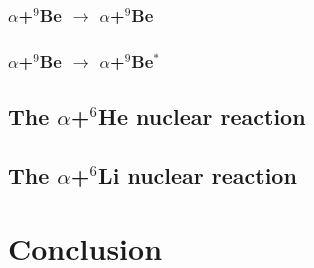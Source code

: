 \documentclass[
11pt, %
english, %
onehalfspacing, %
headsepline, %
]{MastersDoctoralThesis} %
\begin{document}
\subsection{$\alpha$+$^9$Be $\rightarrow$ $\alpha$+$^9$Be}
\subsection{$\alpha$+$^9$Be $\rightarrow$ $\alpha$+$^9$Be$^*$}

\section{The $\alpha$+$^6$He nuclear reaction}

\section{The $\alpha$+$^6$Li nuclear reaction}

\chapter{Conclusion}
% 
%
% 
% 


\appendix %



%
%


\printbibliography[heading=bibintoc]

\end{document}
